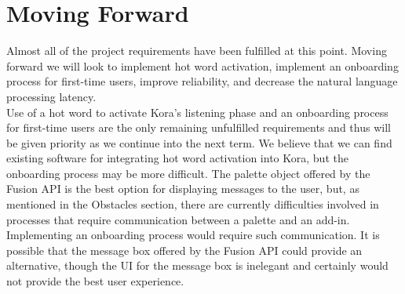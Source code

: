 \documentclass[onecolumn, draftclsnofoot,10pt, compsoc]{IEEEtran}
\begin{document}
\section{Moving Forward}
	Almost all of the project requirements have been fulfilled at this point.
	Moving forward we will look to implement hot word activation, implement an onboarding process for first-time users, improve reliability, and decrease the natural language processing latency. \\

	Use of a hot word to activate Kora's listening phase and an onboarding process for first-time users are the only remaining unfulfilled requirements and thus will be given priority as we continue into the next term.
	We believe that we can find existing software for integrating hot word activation into Kora, but the onboarding process may be more difficult.
	The palette object offered by the Fusion API is the best option for displaying messages to the user, but, as mentioned in the Obstacles section, there are currently difficulties involved in processes that require communication between a palette and an add-in.
	Implementing an onboarding process would require such communication.
	It is possible that the message box offered by the Fusion API could provide an alternative, though the UI for the message box is inelegant and certainly would not provide the best user experience. \\

\nocite{*}

\end{document}
